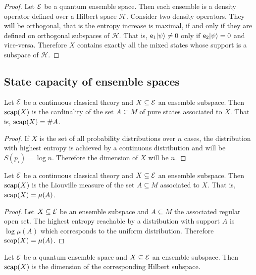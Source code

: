 \begin{proof}
	Let $\mathcal{E}$ be a quantum ensemble space. Then each ensemble is a density operator defined over a Hilbert space $\mathcal{H}$. Consider two density operators. They will be orthogonal, that is the entropy increase is maximal, if and only if they are defined on orthogonal subspaces of $\mathcal{H}$. That is, $\mathsf{e}_1 | \psi \rangle \neq 0$ only if $\mathsf{e}_2 | \psi \rangle = 0$ and vice-versa. Therefore $X$ contains exactly all the mixed states whose support is a subspace of $\mathcal{H}$.
\end{proof}

\subsection{State capacity of ensemble spaces}


\begin{prop}
	Let $\mathcal{E}$ be a continuous classical theory and $X \subseteq \mathcal{E}$ an ensemble subspace. Then $\mathrm{scap}(X)$ is the cardinality of the set $A \subseteq M$ of pure states associated to $X$. That is, $\mathrm{scap}(X) = \#A$.
\end{prop}

\begin{proof}
	If $X$ is the set of all probability distributions over $n$ cases, the distribution with highest entropy is achieved by a continuous distribution and will be $S(p_i) = \log n$. Therefore the dimension of $X$ will be $n$.
\end{proof}

\begin{prop}
	Let $\mathcal{E}$ be a continuous classical theory and $X \subseteq \mathcal{E}$ an ensemble subspace. Then $\mathrm{scap}(X)$ is the Liouville measure of the set $A \subseteq M$ associated to $X$. That is, $\mathrm{scap}(X) = \mu(A)$.
\end{prop}

\begin{proof}
	Let $X \subseteq \mathcal{E}$ be an ensemble subspace and $A \subseteq M$ the associated regular open set. The highest entropy reachable by a distribution with support $A$ is $\log \mu(A)$ which corresponds to the uniform distribution. Therefore $\mathrm{scap}(X) = \mu(A)$.
\end{proof}

\begin{prop}
	Let $\mathcal{E}$ be a quantum ensemble space and $X \subseteq \mathcal{E}$ an ensemble subspace. Then $\mathrm{scap}(X)$ is the dimension of the corresponding Hilbert subspace.
\end{prop}

